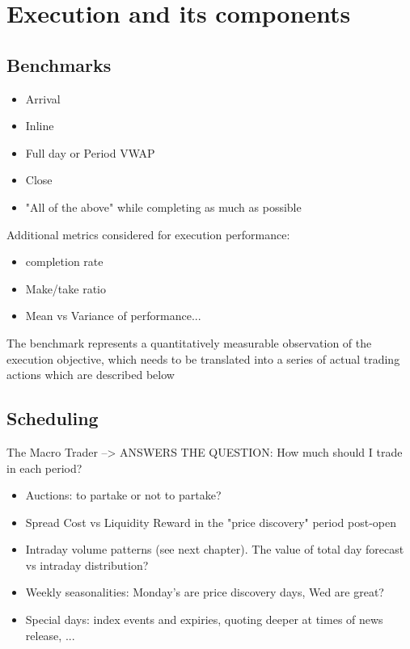 \section{Execution and its components}
\subsection{Benchmarks}

\begin{itemize}
\item Arrival
\item Inline
\item Full day or Period VWAP
\item Close
\item "All of the above" while completing as much as possible
\end{itemize}

Additional metrics considered for execution performance:
\begin{itemize}
\item completion rate
\item Make/take ratio
\item Mean vs Variance of performance...
\end{itemize}

The benchmark represents a quantitatively measurable observation of the execution objective, which needs to be translated into a series of actual trading actions which are described below


\subsection{Scheduling}

The Macro Trader --> ANSWERS THE QUESTION: How much should I trade in each period?

\begin{itemize}
\item Auctions: to partake or not to partake?
\item Spread Cost vs Liquidity Reward in the "price discovery" period post-open
\item Intraday volume patterns (see next chapter). The value of total day forecast vs intraday distribution?
\item Weekly seasonalities: Monday's are price discovery days, Wed are great?
\item Special days: index events and expiries, quoting deeper at times of news release, ...
\end{itemize}


